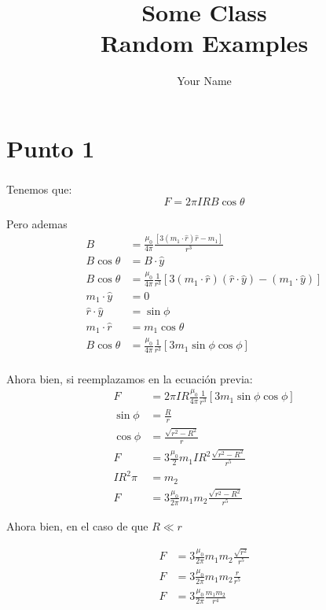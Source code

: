 \documentclass{report}
\title{\Huge{Some Class}\\Random Examples}
\author{\huge{Your Name}}
\date{}
\begin{document}
\maketitle
\newpage%
\tableofcontents
\pagebreak

\chapter{Punto 1}

\subsection{}

Tenemos que:
\[
  F = 2\pi I R B\cos\theta
\]

Pero ademas
\begin{align*}
  B &= \frac{\mu_0}{4\pi} \frac{\left[ 3 (m_1\cdot \hat{r})\hat{r} - m_1 \right]}{r^3}\\
  B \cos\theta &= B \cdot \hat{y}\\
  B\cos\theta &=\frac{\mu_0}{4\pi} \frac{1}{r^3} \left[ 3 (m_1\cdot \hat{r})(\hat{r} \cdot \hat{y}) - (m_1\cdot \hat{y}) \right]\\
  m_1 \cdot \hat{y} &= 0\\
  \hat{r}\cdot\hat{y} &= \sin\phi\\
  m_1 \cdot \hat{r} &= m_1 \cos\theta\\
  B\cos\theta &= \frac{\mu_0}{4\pi} \frac{1}{r^3} \left[ 3 m_1\sin\phi \cos\phi \right]\\
\end{align*}

Ahora bien, si reemplazamos en la ecuación previa:
\begin{align*}
  F &= 2 \pi I R \frac{\mu_0}{4\pi} \frac{1}{r^3} \left[ 3 m_1\sin\phi \cos\phi \right]\\
  \sin\phi &= \frac{R}{r}\\
  \cos\phi &= \frac{\sqrt{r^2 - R^2}}{r}\\
  F &= 3 \frac{\mu_0}{2} m_1 I R^2 \frac{\sqrt{r^2 - R^2}}{r^5}\\
  I R^2 \pi &= m_2\\
  F &= 3 \frac{\mu_0}{2\pi} m_1m_2\frac{\sqrt{r^2 - R^2}}{r^5}
\end{align*}

Ahora bien, en el caso de que $R \ll r$

\begin{align*}
  F &= 3 \frac{\mu_0}{2\pi} m_1m_2\frac{\sqrt{r^2}}{r^5}\\ F &= 3 \frac{\mu_0}{2\pi} m_1m_2\frac{r}{r^5}\\
  F &= 3 \frac{\mu_0}{2\pi} \frac{m_1m_2}{r^4}
\end{align*}
\end{document}
